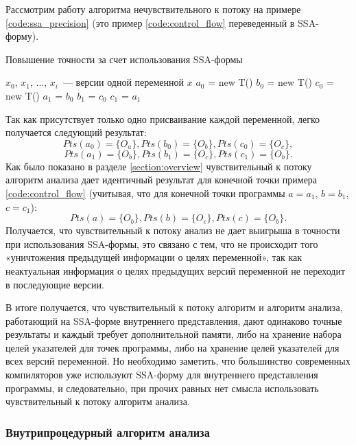 \documentclass[14pt,titlepage]{extarticle}
\newenvironment{fresh}{\color{Blue}}{\color{black}}
\begin{document}
\begin{fresh}
      Рассмотрим работу алгоритма нечувствительного к потоку на
      примере \ref{code:ssa_precision}
      (это пример \ref{code:control_flow} переведенный в SSA-форму).
      \begin{algorithm}
        \caption{Повышение точности за счет использования SSA-формы}
        \label{code:ssa_precision}
        \begin{algorithmic}[1]
          \REQUIRE $x_0$, $x_1$, ..., $x_i$~--- версии одной переменной $x$
          \STATE $a_0$ = new T()
          \STATE $b_0$ = new T()
          \STATE $c_0$ = new T()
          \STATE $a_1$ = $b_0$
          \STATE $b_1$ = $c_0$
          \STATE $c_1$ = $a_1$
        \end{algorithmic}
      \end{algorithm}
      Так как присутствует только одно присваивание каждой переменной, легко
      получается следующий результат:
      \[Pts(a_0) = \{O_a\}, Pts(b_0) = \{O_b\}, Pts(c_0) = \{O_c\},\]
      \[Pts(a_1) = \{O_b\}, Pts(b_1) = \{O_c\}, Pts(c_1) = \{O_b\}.\]
      Как было показано в разделе \ref{section:overview} чувствительный к
      потоку алгоритм анализа дает идентичный результат для конечной точки
      примера \ref{code:control_flow} (учитывая, что для конечной точки
      программы $a = a_1$, $b = b_1$, $c = c_1$):
      \[Pts(a) = \{O_b\}, Pts(b) = \{O_c\}, Pts(c) = \{O_b\}.\]
      Получается, что чувствительный к потоку анализ не дает выигрыша в
      точности при использования SSA-формы, это связано с тем, что не
      происходит того «уничтожения предыдущей информации о целях переменной»,
      так как неактуальная информация о целях предыдущих версий переменной не
      переходит в последующие версии.

      В итоге получается, что чувствительный к потоку алгоритм и алгоритм
      анализа, работающий на SSA-форме внутреннего представления, дают
      одинаково точные результаты и каждый требует дополнительной памяти, либо
      на хранение набора целей указателей для точек программы, либо на хранение
      целей указателей для всех версий переменной. Но необходимо заметить, что
      большинство современных компиляторов уже используют SSA-форму для
      внутреннего представления программы, и следовательно, при прочих равных
      нет смысла использовать чувствительный к потоку алгоритм анализа.

    \subsubsection{Внутрипроцедурный алгоритм анализа}


\end{fresh}
\end{document}
